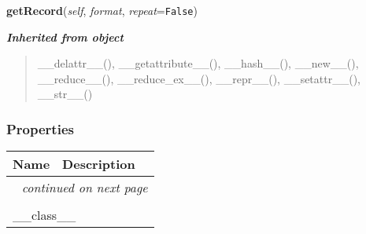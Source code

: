     \vspace{0.5ex}

\hspace{.8\funcindent}\begin{boxedminipage}{\funcwidth}

    \raggedright \textbf{getRecord}(\textit{self}, \textit{format}, \textit{repeat}={\tt False})

\setlength{\parskip}{2ex}
\setlength{\parskip}{1ex}
    \end{boxedminipage}


\large{\textbf{\textit{Inherited from object}}}

\begin{quote}
\_\_delattr\_\_(), \_\_getattribute\_\_(), \_\_hash\_\_(), \_\_new\_\_(), \_\_reduce\_\_(), \_\_reduce\_ex\_\_(), \_\_repr\_\_(), \_\_setattr\_\_(), \_\_str\_\_()
\end{quote}


  \subsubsection{Properties}

    \vspace{-1cm}
\hspace{\varindent}\begin{longtable}{|p{\varnamewidth}|p{\vardescrwidth}|l}
\cline{1-2}
\cline{1-2} \centering \textbf{Name} & \centering \textbf{Description}& \\
\cline{1-2}
\endhead\cline{1-2}\multicolumn{3}{r}{\small\textit{continued on next page}}\\\endfoot\cline{1-2}
\endlastfoot\multicolumn{2}{|l|}{\textit{Inherited from object}}\\
\multicolumn{2}{|p{\varwidth}|}{\raggedright \_\_class\_\_}\\
\cline{1-2}
\end{longtable}



